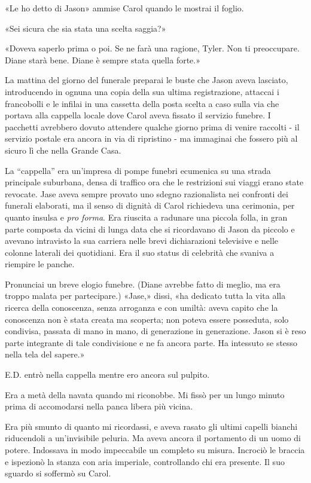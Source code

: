 «Le ho detto di Jason» ammise Carol quando le mostrai il foglio.

«Sei sicura che sia stata una scelta saggia?»

«Doveva saperlo prima o poi. Se ne farà una ragione, Tyler. Non ti
preoccupare. Diane starà bene. Diane è sempre stata quella forte.»

\separatorefiori

La mattina del giorno del funerale preparai le buste che Jason aveva
lasciato, introducendo in ognuna una copia della sua ultima
registrazione, attaccai i francobolli e le infilai in una cassetta della
posta scelta a caso sulla via che portava alla cappella locale dove
Carol aveva fissato il servizio funebre. I pacchetti avrebbero dovuto
attendere qualche giorno prima di venire raccolti - il servizio postale
era ancora in via di ripristino - ma immaginai che fossero più al sicuro
lì che nella Grande Casa.

La ``cappella'' era un'impresa di pompe funebri ecumenica su una strada
principale suburbana, densa di traffico ora che le restrizioni sui
viaggi erano state revocate. Jase aveva sempre provato uno sdegno
razionalista nei confronti dei funerali elaborati, ma il senso di
dignità di Carol richiedeva una cerimonia, per quanto insulsa e
\emph{pro forma}. Era riuscita a radunare una piccola folla, in gran
parte composta da vicini di lunga data che si ricordavano di Jason da
piccolo e avevano intravisto la sua carriera nelle brevi dichiarazioni
televisive e nelle colonne laterali dei quotidiani. Era il suo status di
celebrità che svaniva a riempire le panche.

Pronunciai un breve elogio funebre. (Diane avrebbe fatto di meglio, ma
era troppo malata per partecipare.) «Jase,» dissi, «ha dedicato tutta la
vita alla ricerca della conoscenza, senza arroganza e con umiltà: aveva
capito che la conoscenza non è stata creata ma scoperta; non poteva
essere posseduta, solo condivisa, passata di mano in mano, di
generazione in generazione. Jason si è reso parte integrante di tale
condivisione e ne fa ancora parte. Ha intessuto se stesso nella tela del
sapere.»

E.D. entrò nella cappella mentre ero ancora sul pulpito.

Era a metà della navata quando mi riconobbe. Mi fissò per un lungo
minuto prima di accomodarsi nella panca libera più vicina.

Era più smunto di quanto mi ricordassi, e aveva rasato gli ultimi
capelli bianchi riducendoli a un'invisibile peluria. Ma aveva ancora il
portamento di un uomo di potere. Indossava in modo impeccabile un
completo su misura. Incrociò le braccia e ispezionò la stanza con aria
imperiale, controllando chi era presente. Il suo sguardo si soffermò su
Carol.

